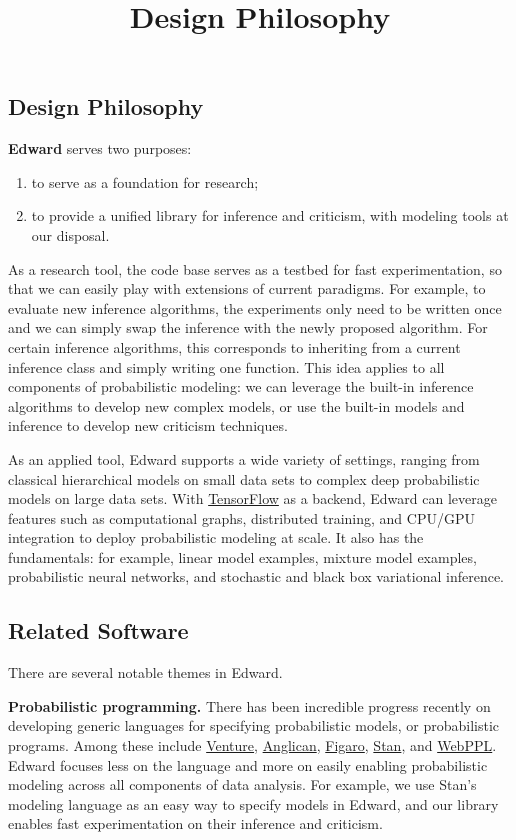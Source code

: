 \title{Design Philosophy}

\subsection{Design Philosophy}

\textbf{Edward} serves two purposes:

\begin{enumerate}
\def\labelenumi{\arabic{enumi}.}
\item
  to serve as a foundation for research;
\item
  to provide a unified library for inference and criticism, with
  modeling tools at our disposal.
\end{enumerate}

As a research tool, the code base serves as a testbed for fast
experimentation, so that we can easily play with extensions of current
paradigms. For example, to evaluate new inference algorithms, the
experiments only need to be written once and we can simply swap the
inference with the newly proposed algorithm. For certain inference
algorithms, this corresponds to inheriting from a current inference
class and simply writing one function. This idea applies to all
components of probabilistic modeling: we can leverage the built-in
inference algorithms to develop new complex models, or use the
built-in models and inference to develop new criticism techniques.

As an applied tool, Edward supports a wide variety of settings,
ranging from classical hierarchical models on small data sets to
complex deep probabilistic models on large data sets. With
\href{https://www.tensorflow.org}{TensorFlow} as a backend, Edward can
leverage features such as computational graphs, distributed training,
and CPU/GPU integration to deploy probabilistic modeling at scale. It
also has the fundamentals: for example, linear model examples, mixture
model examples, probabilistic neural networks, and stochastic and
black box variational inference.

\subsection{Related Software}\label{related-software}

There are several notable themes in Edward.

\textbf{Probabilistic programming.}
There has been incredible progress recently on developing generic
languages for specifying probabilistic models, or probabilistic
programs. Among these include
\href{http://probcomp.csail.mit.edu/venture/}{Venture},
\href{http://www.robots.ox.ac.uk/~fwood/anglican/literature/index.html}{Anglican},
\href{https://www.cra.com/work/case-studies/figaro}{Figaro},
\href{http://mc-stan.org}{Stan}, and
\href{http://dippl.org/chapters/02-webppl.html}{WebPPL}.
Edward focuses less on the language and more on easily enabling
probabilistic modeling across all components of data analysis. For example,
we use Stan's modeling language as an easy way to specify models in
Edward, and our library enables fast experimentation on their
inference and criticism.

